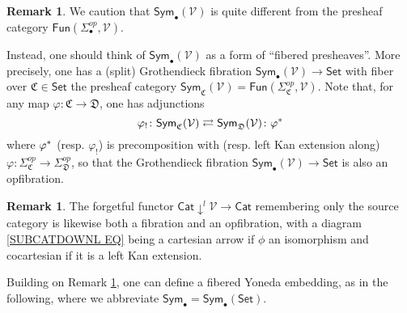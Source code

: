 \documentclass[a4paper,10pt
,draft
]{article}%
\numberwithin{equation}{section}
\numberwithin{figure}{section}
\theoremstyle{definition} %
\newtheorem{remark}[equation]{Remark}%
\newcommand{\Sym}{\ensuremath{\mathsf{Sym}}}%
\newcommand{\V}{\ensuremath{\mathcal V}}
\newcommand{\1}{\ensuremath{\mathbbm 1}}%
\begin{document}
\begin{remark}\label{COLCHADJ REM}
	We caution that 
	$\mathsf{Sym}_{\bullet}(\V)$
	is quite different from the presheaf category 
	$\mathsf{Fun}(\Sigma_{\bullet}^{op},\V)$.
	
	Instead, one should think of 
	$\mathsf{Sym}_{\bullet}(\V)$
	as a form of ``fibered presheaves''.
	More precisely, 
	one has a (split) Grothendieck fibration
	$\mathsf{Sym}_{\bullet}(\V) \to \mathsf{Set}$
	with fiber over 
	$\mathfrak{C} \in \mathsf{Set}$
	the presheaf category
	$\Sym_{\mathfrak C}(\V)=
	\mathsf{Fun}(\Sigma_{\mathfrak{C}}^{op},\mathcal{V})$.
	Note that,
	for any map $\varphi \colon \mathfrak{C} \to \mathfrak{D}$,
	one has adjunctions
	\begin{equation}\label{COLCHADJ EQ}
	\varphi_! \colon \Sym_{\mathfrak C}(\V) 
	\rightleftarrows 
	\Sym_{\mathfrak D}(\V) \colon \varphi^{\**}
	\end{equation}
	where $\varphi^{\**}$
	(resp. $\varphi_!$)
	is precomposition with (resp. left Kan extension along)
	$\varphi\colon 
	\Sigma^{op}_{\mathfrak{C}}
	\to 
	\Sigma^{op}_{\mathfrak{D}}$,
	so that the Grothendieck fibration
	$\mathsf{Sym}_{\bullet}(\V) \to \mathsf{Set}$
	is also an opfibration. 
\end{remark}


\begin{remark}\label{SUBCOCART REM}
	The forgetful functor $\mathsf{Cat} \downarrow^l \mathcal{V} \to \mathsf{Cat}$
	remembering only the source category is likewise both a fibration and an opfibration, 
	with a diagram \eqref{SUBCATDOWNL EQ}
	being a cartesian arrow if  $\phi$ an isomorphism
	and cocartesian if it is a left Kan extension. 
\end{remark}


Building on Remark \ref{COLCHADJ REM},
one can define a fibered Yoneda embedding, as in the following,
where we abbreviate
$\mathsf{Sym}_{\bullet} = \mathsf{Sym}_{\bullet}(\mathsf{Set})$.
\end{document}
